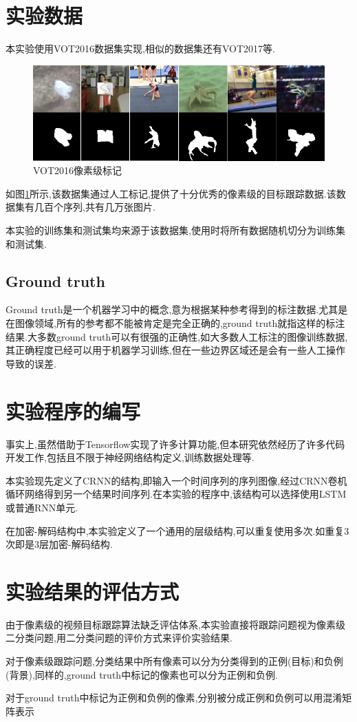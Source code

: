 \section{实验数据}
本实验使用VOT2016数据集\supercite{Vojir-TR-2017-01}实现,相似的数据集还有VOT2017等.
\par
\begin{figure}[htbp!]
    \centering
    \includegraphics[width = 1.\textwidth]{chap/img/vot_2016_pixel.png}
    \caption{VOT2016像素级标记}\label{fig:vot_2016_pixel}
\end{figure}
\par
如图\ref{fig:vot_2016_pixel}所示,该数据集通过人工标记,提供了十分优秀的像素级的目标跟踪数据.该数据集有几百个序列,共有几万张图片.
\par
本实验的训练集和测试集均来源于该数据集,使用时将所有数据随机切分为训练集和测试集.
\subsection{Ground truth}
Ground truth是一个机器学习中的概念,意为根据某种参考得到的标注数据.尤其是在图像领域,所有的参考都不能被肯定是完全正确的,ground truth就指这样的标注结果.大多数ground truth可以有很强的正确性,如大多数人工标注的图像训练数据,其正确程度已经可以用于机器学习训练,但在一些边界区域还是会有一些人工操作导致的误差.

\section{实验程序的编写}
事实上,虽然借助于Tensorflow实现了许多计算功能,但本研究依然经历了许多代码开发工作,包括且不限于神经网络结构定义,训练数据处理等.
\par
本实验现先定义了CRNN的结构,即输入一个时间序列的序列图像,经过CRNN卷机循环网络得到另一个结果时间序列.在本实验的程序中,该结构可以选择使用LSTM或普通RNN单元.
\par
在加密-解码结构中,本实验定义了一个通用的层级结构,可以重复使用多次.如重复3次即是3层加密-解码结构.

\section{实验结果的评估方式}
由于像素级的视频目标跟踪算法缺乏评估体系,本实验直接将跟踪问题视为像素级二分类问题,用二分类问题的评价方式来评价实验结果.
\par
对于像素级跟踪问题,分类结果中所有像素可以分为分类得到的正例(目标)和负例(背景),同样的,ground truth中标记的像素也可以分为正例和负例.
\par
对于ground truth中标记为正例和负例的像素,分别被分成正例和负例可以用混淆矩阵表示
